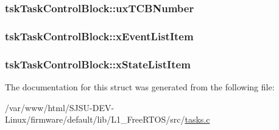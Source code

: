 \subsubsection[{\texorpdfstring{ux\+T\+C\+B\+Number}{uxTCBNumber}}]{ tsk\+Task\+Control\+Block\+::ux\+T\+C\+B\+Number}\hypertarget{structtskTaskControlBlock_a3f3169fa5667af8ee542304f8dd48553}{}\label{structtskTaskControlBlock_a3f3169fa5667af8ee542304f8dd48553}
\subsubsection[{\texorpdfstring{x\+Event\+List\+Item}{xEventListItem}}]{ tsk\+Task\+Control\+Block\+::x\+Event\+List\+Item}\hypertarget{structtskTaskControlBlock_a1a1612b6081a13683808284d93a9b28f}{}\label{structtskTaskControlBlock_a1a1612b6081a13683808284d93a9b28f}
\subsubsection[{\texorpdfstring{x\+State\+List\+Item}{xStateListItem}}]{ tsk\+Task\+Control\+Block\+::x\+State\+List\+Item}\hypertarget{structtskTaskControlBlock_a16e0d20425d53ac78537e1fdb8834cf6}{}\label{structtskTaskControlBlock_a16e0d20425d53ac78537e1fdb8834cf6}


The documentation for this struct was generated from the following file\+:\begin{DoxyCompactItemize}
\item 
/var/www/html/\+S\+J\+S\+U-\/\+D\+E\+V-\/\+Linux/firmware/default/lib/\+L1\+\_\+\+Free\+R\+T\+O\+S/src/\hyperlink{tasks_8c}{tasks.\+c}\end{DoxyCompactItemize}
